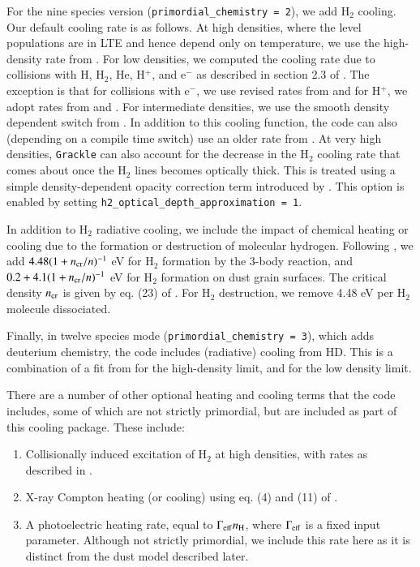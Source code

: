 For the nine species version (\texttt{primordial\_chemistry = 2}), we add H$_2$ cooling.  Our default cooling rate is as follows.  At high densities, where the level populations are in LTE and hence depend only on temperature, we use the high-density rate from \citet{1998A&A...335..403G}. For low densities, we computed the cooling rate due to collisions with H, H$_2$, He, H$^+$, and e$^-$ as described in section 2.3 of  \citet{2008MNRAS.388.1627G}.  The exception is that for collisions with e$^-$, we use revised rates from \citet{yoon2008cross} and for H$^+$, we adopt rates from \citet{2011PhRvL.107b3201H} and \citet{2012PhRvL.108j9903H}.  For intermediate densities, we use the smooth density dependent switch from \citet{1998A&A...335..403G}.  In addition to this cooling function, the code can also (depending on a compile time switch) use an older rate from \citet{1983ApJ...270..578L}. At very high densities, \texttt{Grackle} can also account for the decrease in the H$_{2}$ cooling rate that comes about once the H$_{2}$ lines becomes optically thick. This is treated using a simple density-dependent opacity correction term introduced by \citet{2004MNRAS.348.1019R}. This option is enabled by setting \texttt{h2\_optical\_depth\_approximation = 1}.

\label{sec:chemheat}

In addition to H$_2$ radiative cooling, we include the impact of chemical heating or cooling due to the formation or destruction of molecular hydrogen.  Following \citet{2000ApJ...534..809O}, we add $4.48 (1 + n_{\rm cr}/n)^{-1}$ eV for H$_2$ formation by the 3-body reaction, and $0.2 + 4.1(1 + n_{\rm cr}/n)^{-1}$ eV for H$_2$ formation on dust grain surfaces.  The critical density $n_{\rm cr}$ is given by eq. (23) of  \citet{2000ApJ...534..809O}.  For H$_2$ destruction, we remove 4.48 eV per H$_2$ molecule dissociated.

Finally, in twelve species mode (\texttt{primordial\_chemistry = 3}), which adds deuterium chemistry, the code includes (radiative) cooling from HD.  This is a combination of a fit from \citet{2011MNRAS.415..487C} for the high-density limit, and \citet{2007MNRAS.382..133W} for the low density limit.

There are a number of other optional heating and cooling terms that the code includes, some of which are not strictly primordial, but are included as part of this cooling package.  These include:  
\begin{enumerate}
\item Collisionally induced excitation of H$_2$ at high densities, with rates as described in \citet{2004MNRAS.348.1019R}.
\item X-ray Compton heating (or cooling) using eq. (4) and (11) of \citet{1999ApJ...517L...9M}.
\item A photoelectric heating rate, equal to $\Gamma_{\rm eff} n_{\rm H}$, where $\Gamma_{\rm eff}$ is a fixed input parameter.  Although not strictly primordial, we include this rate here as it is distinct from the dust model described later.
\end{enumerate}


